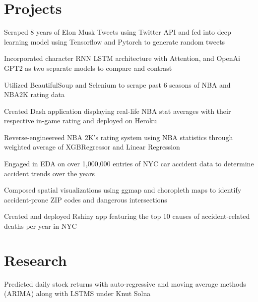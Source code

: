 \documentclass[]{deedy-resume-openfont}
\begin{document}
\begin{minipage}[t]{0.66\textwidth}

\section{Projects}
\location{}
\begin{tightemize} 
\item Scraped 8 years of Elon Musk Tweets using Twitter API and fed into deep learning model using Tensorflow and Pytorch to generate random tweets
\item Incorporated character RNN LSTM architecture with Attention, and OpenAi GPT2 as two separate models to compare and contrast
\end{tightemize}
\location{}
\begin{tightemize} 
\item Utilized BeautifulSoup and Selenium to scrape past 6 seasons of NBA and NBA2K rating data
\item Created Dash application displaying real-life NBA stat averages with their respective in-game rating and deployed on Heroku
\item Reverse-engineereed NBA 2K's rating system using NBA statistics through weighted average of XGBRegressor and Linear Regression
\end{tightemize}
\location{}
\begin{tightemize} 
\item Engaged in EDA on over 1,000,000 entries of NYC car accident data to determine accident trends over the years
\item Composed spatial visualizations using ggmap and choropleth maps to identify accident-prone ZIP codes and dangerous intersections
\item Created and deployed Rshiny app featuring the top 10 causes of accident-related deaths per year in NYC
\end{tightemize}
\sectionsep


\section{Research}
\begin{tightemize} 
\item Predicted daily stock returns with auto-regressive and moving average methods (ARIMA) along with LSTMS under Knut Solna
\end{tightemize}
\sectionsep


\end{minipage} 
\end{document}
